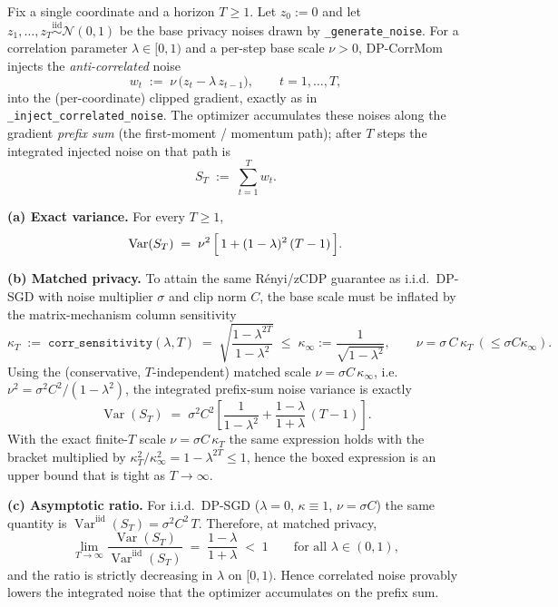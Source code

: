 \begin{theorem}
\label{thm:t6-prefix-noise}
Fix a single coordinate and a horizon $T\ge 1$. Let $z_0:=0$ and let $z_1,\dots,z_T\overset{\mathrm{iid}}{\sim}\mathcal N(0,1)$ be the base privacy noises drawn by \texttt{\_generate\_noise}. For a correlation parameter $\lambda\in[0,1)$ and a per-step base scale $\nu>0$, DP-CorrMom injects the \emph{anti-correlated} noise
\[
w_t \;:=\; \nu\,\bigl(z_t-\lambda\,z_{t-1}\bigr),\qquad t=1,\dots,T,
\]
into the (per-coordinate) clipped gradient, exactly as in \texttt{\_inject\_correlated\_noise}. The optimizer accumulates these noises along the gradient \emph{prefix sum} (the first-moment / momentum path); after $T$ steps the integrated injected noise on that path is
\[
S_T \;:=\; \sum_{t=1}^{T} w_t .
\]

\medskip
\noindent\textbf{(a) Exact variance.} For every $T\ge1$,
\[
\operatorname{Var}(S_T)\;=\;\nu^2\,\Bigl[\,1+(1-\lambda)^2\,(T-1)\,\Bigr].
\]

\medskip
\noindent\textbf{(b) Matched privacy.} To attain the same R\'enyi/zCDP guarantee as i.i.d.\ DP-SGD with noise multiplier $\sigma$ and clip norm $C$, the base scale must be inflated by the matrix-mechanism column sensitivity
\[
\kappa_T \;:=\; \mathtt{corr\_sensitivity}(\lambda,T)\;=\;\sqrt{\frac{1-\lambda^{2T}}{1-\lambda^{2}}}\;\le\;\kappa_\infty:=\frac{1}{\sqrt{1-\lambda^2}},
\qquad \nu=\sigma\,C\,\kappa_T\ (\le \sigma C\kappa_\infty).
\]
Using the (conservative, $T$-independent) matched scale $\nu=\sigma C\,\kappa_\infty$, i.e.\ $\nu^2=\sigma^2C^2/(1-\lambda^2)$, the integrated prefix-sum noise variance is exactly
\[
\boxed{\ \operatorname{Var}(S_T)
\;=\;\sigma^2 C^2\!\left[\frac{1}{1-\lambda^2}+\frac{1-\lambda}{1+\lambda}\,(T-1)\right].\ }
\]
With the exact finite-$T$ scale $\nu=\sigma C\,\kappa_T$ the same expression holds with the bracket multiplied by $\kappa_T^2/\kappa_\infty^2=1-\lambda^{2T}\le1$, hence the boxed expression is an upper bound that is tight as $T\to\infty$.

\medskip
\noindent\textbf{(c) Asymptotic ratio.} For i.i.d.\ DP-SGD ($\lambda=0$, $\kappa\equiv1$, $\nu=\sigma C$) the same quantity is $\operatorname{Var}^{\mathrm{iid}}(S_T)=\sigma^2C^2\,T$. Therefore, at matched privacy,
\[
\lim_{T\to\infty}\frac{\operatorname{Var}(S_T)}{\operatorname{Var}^{\mathrm{iid}}(S_T)}
\;=\;\frac{1-\lambda}{1+\lambda}\;<\;1\qquad\text{for all }\lambda\in(0,1),
\]
and the ratio is strictly decreasing in $\lambda$ on $[0,1)$. Hence correlated noise provably lowers the integrated noise that the optimizer accumulates on the prefix sum.
\end{theorem}

